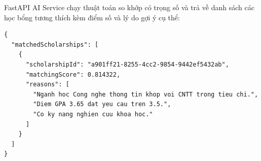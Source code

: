 FastAPI AI Service chạy thuật toán so khớp có trọng số và trả về danh sách các học bổng tương thích kèm điểm số và lý do gợi ý cụ thể:

\begin{lstlisting}[caption={Response gợi ý học bổng tương thích từ AI}]
{
  "matchedScholarships": [
    {
      "scholarshipId": "a901ff21-8255-4cc2-9854-9442ef5432ab",
      "matchingScore": 0.814322,
      "reasons": [
        "Nganh hoc Cong nghe thong tin khop voi CNTT trong tieu chi.",
        "Diem GPA 3.65 dat yeu cau tren 3.5.",
        "Co ky nang nghien cuu khoa hoc."
      ]
    }
  ]
}
\end{lstlisting}